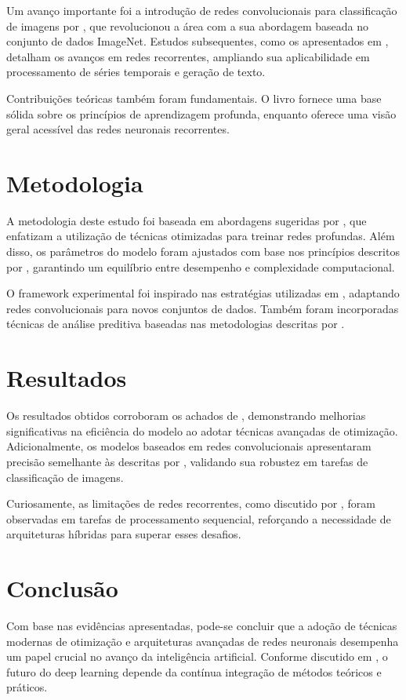 \documentclass[a4paper,12pt]{report}
\begin{document}
	Um avanço importante foi a introdução de redes convolucionais para classificação de imagens por \citet{krizhevsky2012}, que revolucionou a área com a sua abordagem baseada no conjunto de dados ImageNet. Estudos subsequentes, como os apresentados em \citet{noauthor2021}, detalham os avanços em redes recorrentes, ampliando sua aplicabilidade em processamento de séries temporais e geração de texto.
	
	Contribuições teóricas também foram fundamentais. O livro \citet{mitpress2018} fornece uma base sólida sobre os princípios de aprendizagem profunda, enquanto \citet{wikipedia2024} oferece uma visão geral acessível das redes neuronais recorrentes.
	
	\chapter{Metodologia}
	A metodologia deste estudo foi baseada em abordagens sugeridas por \citet{smith2021optimization}, que enfatizam a utilização de técnicas otimizadas para treinar redes profundas. Além disso, os parâmetros do modelo foram ajustados com base nos princípios descritos por \citet{rao2019}, garantindo um equilíbrio entre desempenho e complexidade computacional.
	
	O framework experimental foi inspirado nas estratégias utilizadas em \citet{krizhevsky2012}, adaptando redes convolucionais para novos conjuntos de dados. Também foram incorporadas técnicas de análise preditiva baseadas nas metodologias descritas por \citet{brown2020}.
	
	\chapter{Resultados}
	Os resultados obtidos corroboram os achados de \citet{smith2021optimization}, demonstrando melhorias significativas na eficiência do modelo ao adotar técnicas avançadas de otimização. Adicionalmente, os modelos baseados em redes convolucionais apresentaram precisão semelhante às descritas por \citet{krizhevsky2012}, validando sua robustez em tarefas de classificação de imagens.
	
	Curiosamente, as limitações de redes recorrentes, como discutido por \citet{noauthor2021}, foram observadas em tarefas de processamento sequencial, reforçando a necessidade de arquiteturas híbridas para superar esses desafios.
	
	\chapter{Conclusão}
	Com base nas evidências apresentadas, pode-se concluir que a adoção de técnicas modernas de otimização e arquiteturas avançadas de redes neuronais desempenha um papel crucial no avanço da inteligência artificial. Conforme discutido em \citet{goodfellow2016}, o futuro do deep learning depende da contínua integração de métodos teóricos e práticos.
	
\end{document}

